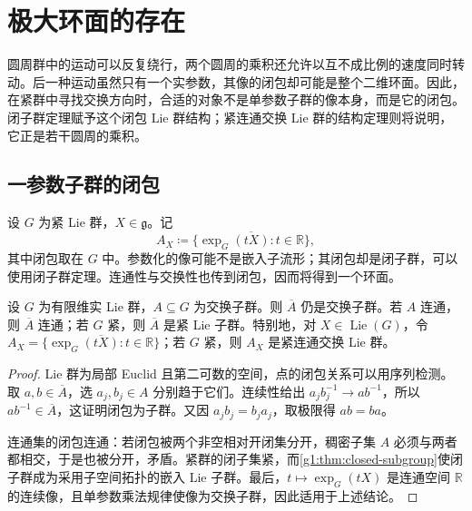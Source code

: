 
% 
% 

\section{极大环面的存在}
\label{g1:sec:1902}

圆周群中的运动可以反复绕行，两个圆周的乘积还允许以互不成比例的速度同时转动。后一种运动虽然只有一个实参数，其像的闭包却可能是整个二维环面。因此，在紧群中寻找交换方向时，合适的对象不是单参数子群的像本身，而是它的闭包。闭子群定理赋予这个闭包 Lie 群结构；紧连通交换 Lie 群的结构定理则将说明，它正是若干圆周的乘积。

\subsection{一参数子群的闭包}
\label{g1:subsec:1902:01}
设 \(G\) 为紧 Lie 群，\(X\in\mathfrak g\)。记
\[
	A_X\coloneqq\overline{\{\exp_G(tX):t\in\mathbb R\}},
\]
其中闭包取在 \(G\) 中。参数化的像可能不是嵌入子流形；其闭包却是闭子群，可以使用闭子群定理。连通性与交换性也传到闭包，因而将得到一个环面。

\begin{lemma}\label{g1:lem:abelian-subgroup-closure}
	设 \(G\) 为有限维实 Lie 群，\(A\subseteq G\) 为交换子群。则 \(\overline A\) 仍是交换子群。若 \(A\) 连通，则 \(\overline A\) 连通；若 \(G\) 紧，则 \(\overline A\) 是紧 Lie 子群。特别地，对 \(X\in\operatorname{Lie}(G)\)，令 \(A_X=\overline{\{\exp_G(tX):t\in\mathbb R\}}\)；若 \(G\) 紧，则 \(A_X\) 是紧连通交换 Lie 群。
\end{lemma}
\begin{proof}
	Lie 群为局部 Euclid 且第二可数的空间，点的闭包关系可以用序列检测。取 \(a,b\in\overline A\)，选 \(a_j,b_j\in A\) 分别趋于它们。连续性给出 \(a_jb_j^{-1}\to ab^{-1}\)，所以 \(ab^{-1}\in\overline A\)，这证明闭包为子群。又因 \(a_jb_j=b_ja_j\)，取极限得 \(ab=ba\)。

	连通集的闭包连通：若闭包被两个非空相对开闭集分开，稠密子集 \(A\) 必须与两者都相交，于是也被分开，矛盾。紧群的闭子集紧，而\cref{g1:thm:closed-subgroup}使闭子群成为采用子空间拓扑的嵌入 Lie 子群。最后，\(t\mapsto\exp_G(tX)\) 是连通空间 \(\mathbb R\) 的连续像，且单参数乘法规律使像为交换子群，因此适用于上述结论。
\end{proof}

